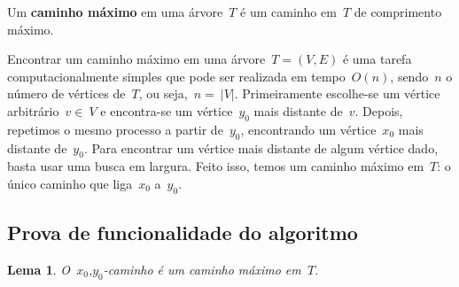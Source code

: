 \documentclass[a4paper,12pt]{article}
\newtheorem{lem}{Lema}
\begin{document}
	Um \textbf{caminho máximo} em uma árvore~$T$ é um caminho 
	em~$T$ de comprimento máximo.

	Encontrar um caminho máximo em uma árvore~$T=(V,E)$ é uma tarefa
	computacionalmente simples que pode ser realizada em tempo~$O(n)$, 
	sendo~$n$ o número de vértices de~$T$, ou seja,~$n =~|V|$. 
	Primeiramente escolhe-se um vértice arbitrário~$v \in~V$ 
	e encontra-se um vértice~$y_0$ mais distante de~$v$.
	Depois, repetimos o mesmo processo a partir de~$y_0$, 
	encontrando um vértice~$x_0$ mais distante de~$y_0$. 
	Para encontrar um vértice mais distante de algum vértice dado, 
	basta usar uma busca em largura.  
	Feito isso, temos um caminho máximo em~$T$: o único
	caminho que liga~$x_0$ a~$y_0$.

	\bigskip

	\subsection{Prova de funcionalidade do algoritmo}

	\begin{lem}
	\label{lema:caminhoMax}
		O~$x_0$,$y_0$-caminho é um caminho máximo em~$T$.
	\end{lem}

	\bigskip
\end{document}
